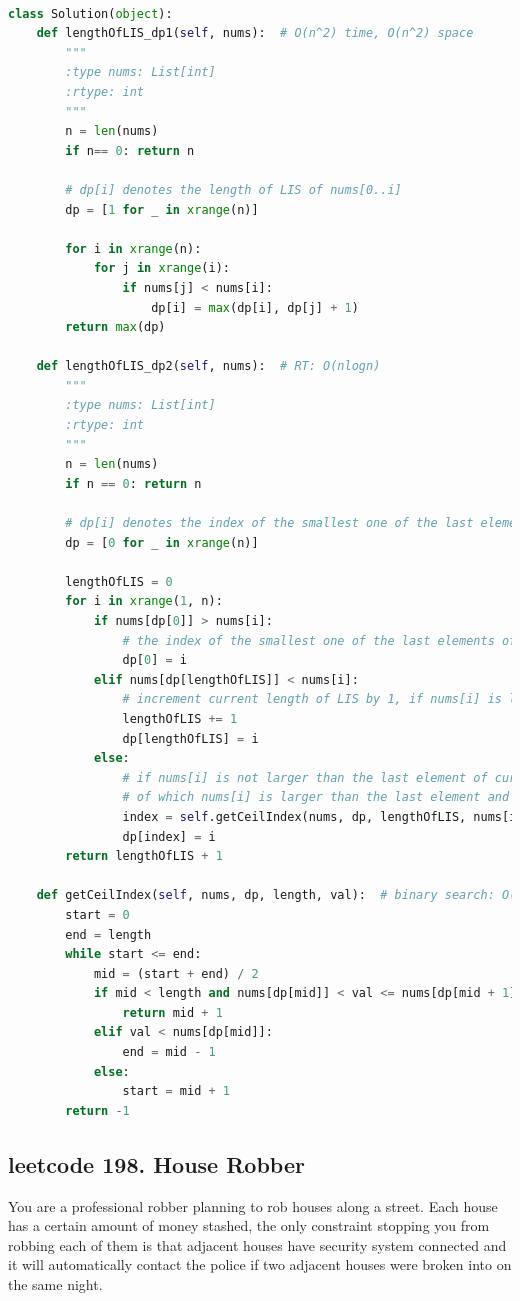 \documentclass[a4paper,10pt]{article}
\begin{document}
\begin{lstlisting}[language=Python, caption=Problem300. Longest Increasing Subsequence]

class Solution(object):
    def lengthOfLIS_dp1(self, nums):  # O(n^2) time, O(n^2) space
        """
        :type nums: List[int]
        :rtype: int
        """
        n = len(nums)
        if n== 0: return n

        # dp[i] denotes the length of LIS of nums[0..i]
        dp = [1 for _ in xrange(n)]

        for i in xrange(n):
            for j in xrange(i):
                if nums[j] < nums[i]:
                    dp[i] = max(dp[i], dp[j] + 1)
        return max(dp)

    def lengthOfLIS_dp2(self, nums):  # RT: O(nlogn)
        """
        :type nums: List[int]
        :rtype: int
        """
        n = len(nums)
        if n == 0: return n

        # dp[i] denotes the index of the smallest one of the last elements of all i-length LISs
        dp = [0 for _ in xrange(n)]

        lengthOfLIS = 0
        for i in xrange(1, n):
            if nums[dp[0]] > nums[i]:
                # the index of the smallest one of the last elements of all LISs of length 1
                dp[0] = i
            elif nums[dp[lengthOfLIS]] < nums[i]:
                # increment current length of LIS by 1, if nums[i] is larger than the last element of current LIS
                lengthOfLIS += 1
                dp[lengthOfLIS] = i
            else:
                # if nums[i] is not larger than the last element of current LIS, then binary search for a shorter LIS,
                # of which nums[i] is larger than the last element and can increment the length by 1.
                index = self.getCeilIndex(nums, dp, lengthOfLIS, nums[i])
                dp[index] = i
        return lengthOfLIS + 1

    def getCeilIndex(self, nums, dp, length, val):  # binary search: O(logn)
        start = 0
        end = length
        while start <= end:
            mid = (start + end) / 2
            if mid < length and nums[dp[mid]] < val <= nums[dp[mid + 1]]:
                return mid + 1
            elif val < nums[dp[mid]]:
                end = mid - 1
            else:
                start = mid + 1
        return -1
\end{lstlisting}


\subsection{leetcode 198. House Robber}
You are a professional robber planning to rob houses along a street. Each house has a certain amount of money stashed, the only constraint stopping you from robbing each of them is that adjacent houses have security system connected and it will automatically contact the police if two adjacent houses were broken into on the same night. \\
\end{document}
